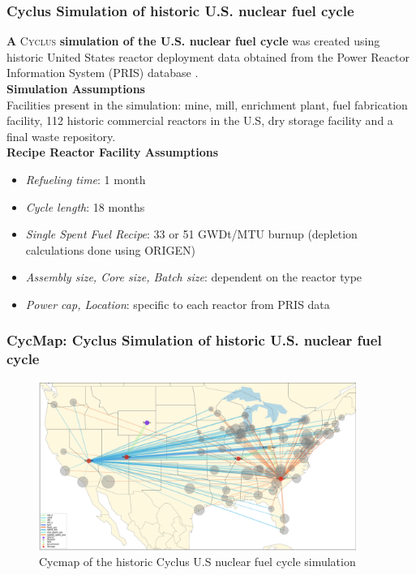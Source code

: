 \begin{frame}
    \frametitle{Cyclus Simulation of historic U.S. nuclear fuel cycle}
    \textbf{A} \textsc{Cyclus} \textbf{simulation of the U.S. nuclear fuel cycle} was created using historic United States reactor deployment data obtained from the Power Reactor Information System (PRIS) database \cite{peterson_unf_2017}. 
    \\

    \textbf{Simulation Assumptions} \\
    Facilities present in the simulation: mine, mill, enrichment plant, fuel fabrication facility, 112 historic commercial reactors in the U.S, dry storage facility and a final waste repository. 
    \\

    \textbf{Recipe Reactor Facility Assumptions}
    \begin{itemize}
    \item \textit{Refueling time}: 1 month 
    \item \textit{Cycle length}: 18 months 
    \item \textit{Single Spent Fuel Recipe}: 33 or 51 GWDt/MTU burnup (depletion calculations done using ORIGEN)
    \item \textit{Assembly size, Core size, Batch size}: dependent on the reactor type 
    \item \textit{Power cap, Location}: specific to each reactor from PRIS data
    \end{itemize}
  \end{frame}

  \begin{frame}
    \frametitle{CycMap: Cyclus Simulation of historic U.S. nuclear fuel cycle}
    \begin{figure}[htbp!]
      \begin{center}
        \includegraphics[height=5.5cm]{../figures/cycmap}
      \end{center}
            \caption{Cycmap of the historic Cyclus U.S nuclear fuel cycle simulation \cite{park_arfc/cycmap_2018}}
    \end{figure}
  \end{frame}

